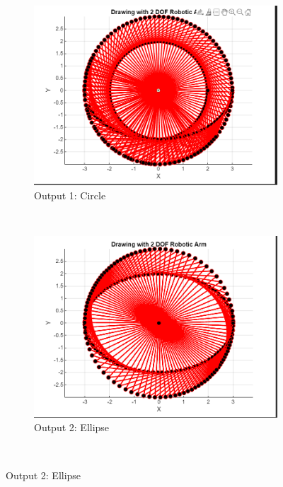 \documentclass{article}
\begin{document}
\begin{figure}[]
    

    \centering
    \begin{subfigure}[b]{0.8\textwidth}
        \centering
        \includegraphics[width=\textwidth]{image_1.png}
        \caption{Output 1: Circle}
        \label{fig:output-circle}
    \end{subfigure}
    \\
    \begin{subfigure}[b]{0.8\textwidth}
        \centering
        \includegraphics[width=\textwidth]{image_2.png}
        \caption{Output 2: Ellipse}
        \label{fig:output-ellipse}
    \end{subfigure}
    \\

\end{figure}
\end{document}

